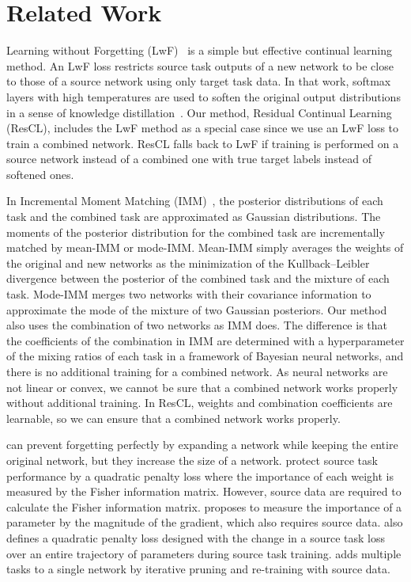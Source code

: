 \documentclass[letterpaper]{article}
\begin{document}
\section{Related Work}



Learning without Forgetting (LwF)~\cite{li2018learning} is a simple but effective continual learning method. An LwF loss restricts source task outputs of a new network to be close to those of a source network using only target task data. In that work, softmax layers with high temperatures are used to soften the original output distributions in a sense of knowledge distillation~\cite{hinton2015distilling}.
Our method, Residual Continual Learning (ResCL), includes the LwF method as a special case since we use an LwF loss to train a combined network. ResCL falls back to LwF if training is performed on a source network instead of a combined one with true target labels instead of softened ones.


In Incremental Moment Matching (IMM)~\cite{lee2017overcoming}, the posterior distributions of each task and the combined task are approximated as Gaussian distributions. The moments of the posterior distribution for the combined task are incrementally matched by mean-IMM or mode-IMM. Mean-IMM simply averages the weights of the original and new networks as the minimization of the Kullback--Leibler divergence between the posterior of the combined task and the mixture of each task. Mode-IMM merges two networks with their covariance information to approximate the mode of the mixture of two Gaussian posteriors.
Our method also uses the combination of two networks as IMM does. The difference is that the coefficients of the combination in IMM are determined with a hyperparameter of the mixing ratios of each task in a framework of Bayesian neural networks, and there is no additional training for a combined network.
As neural networks are not linear or convex, we cannot be sure that a combined network works properly without additional training.
In ResCL, weights and combination coefficients are learnable, so we can ensure that a combined network works properly.


\cite{terekhov2015knowledge,rusu2016progressive} can prevent forgetting perfectly by expanding a network while keeping the entire original network, but they increase the size of a network.
\cite{kirkpatrick2017overcoming,ritter2018online} protect source task performance by a quadratic penalty loss where the importance of each weight is measured by the Fisher information matrix. However, source data are required to calculate the Fisher information matrix.
\cite{aljundi2018memory} proposes to measure the importance of a parameter by the magnitude of the gradient, which also requires source data.
\cite{zenke2017continual} also defines a quadratic penalty loss designed with the change in a source task loss over an entire trajectory of parameters during source task training.
\cite{mallya2018packnet} adds multiple tasks to a single network by iterative pruning and re-training with source data.
\end{document}
